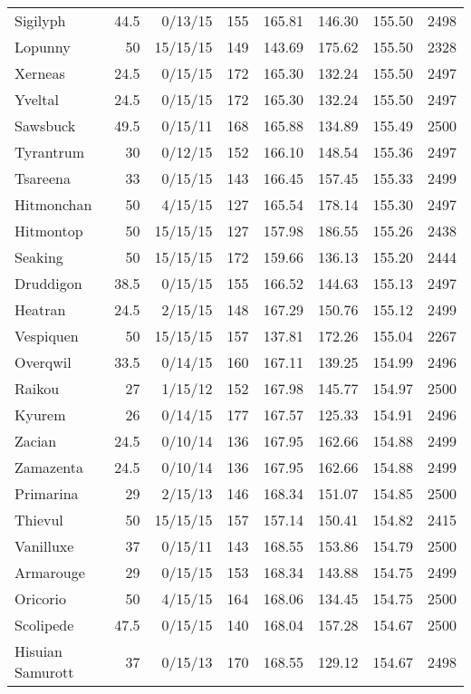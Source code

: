 \begin{longtable}{lrrrrrrr}
Sigilyph & 44.5 & 0/13/15 & 155 & 165.81 & 146.30 & 155.50 & 2498\\
Lopunny & 50 & 15/15/15 & 149 & 143.69 & 175.62 & 155.50 & 2328\\
Xerneas & 24.5 & 0/15/15 & 172 & 165.30 & 132.24 & 155.50 & 2497\\
Yveltal & 24.5 & 0/15/15 & 172 & 165.30 & 132.24 & 155.50 & 2497\\
Sawsbuck & 49.5 & 0/15/11 & 168 & 165.88 & 134.89 & 155.49 & 2500\\
Tyrantrum & 30 & 0/12/15 & 152 & 166.10 & 148.54 & 155.36 & 2497\\
Tsareena & 33 & 0/15/15 & 143 & 166.45 & 157.45 & 155.33 & 2499\\
Hitmonchan & 50 & 4/15/15 & 127 & 165.54 & 178.14 & 155.30 & 2497\\
Hitmontop & 50 & 15/15/15 & 127 & 157.98 & 186.55 & 155.26 & 2438\\
Seaking & 50 & 15/15/15 & 172 & 159.66 & 136.13 & 155.20 & 2444\\
Druddigon & 38.5 & 0/15/15 & 155 & 166.52 & 144.63 & 155.13 & 2497\\
Heatran & 24.5 & 2/15/15 & 148 & 167.29 & 150.76 & 155.12 & 2499\\
Vespiquen & 50 & 15/15/15 & 157 & 137.81 & 172.26 & 155.04 & 2267\\
Overqwil & 33.5 & 0/14/15 & 160 & 167.11 & 139.25 & 154.99 & 2496\\
Raikou & 27 & 1/15/12 & 152 & 167.98 & 145.77 & 154.97 & 2500\\
Kyurem & 26 & 0/14/15 & 177 & 167.57 & 125.33 & 154.91 & 2496\\
Zacian & 24.5 & 0/10/14 & 136 & 167.95 & 162.66 & 154.88 & 2499\\
Zamazenta & 24.5 & 0/10/14 & 136 & 167.95 & 162.66 & 154.88 & 2499\\
Primarina & 29 & 2/15/13 & 146 & 168.34 & 151.07 & 154.85 & 2500\\
Thievul & 50 & 15/15/15 & 157 & 157.14 & 150.41 & 154.82 & 2415\\
Vanilluxe & 37 & 0/15/11 & 143 & 168.55 & 153.86 & 154.79 & 2500\\
Armarouge & 29 & 0/15/15 & 153 & 168.34 & 143.88 & 154.75 & 2499\\
Oricorio & 50 & 4/15/15 & 164 & 168.06 & 134.45 & 154.75 & 2500\\
Scolipede & 47.5 & 0/15/15 & 140 & 168.04 & 157.28 & 154.67 & 2500\\
Hisuian Samurott & 37 & 0/15/13 & 170 & 168.55 & 129.12 & 154.67 & 2498\\

\end{longtable}
